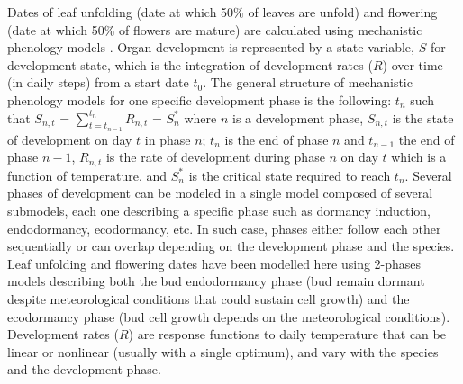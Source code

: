 \documentclass[letterpaper,8pt]{extarticle}  %
\begin{document}
\begin{doublespacing}
\begin{linenumbers}
Dates of leaf unfolding (date at which 50\% of leaves are unfold) and flowering (date at which 50\% of flowers are mature) are calculated using mechanistic phenology models \citep{Chuine2017}. Organ development is represented by a state variable, $S$ for development state, which is the integration of development rates ($R$) over time (in daily steps) from a start date $t_0$. The general structure of mechanistic phenology models for one specific development phase is the following:
$t_n$ such that $S_{n,t}$ = $\sum_{t=t_{n-1}}^{t_n} R_{n,t}$ = $S_n^*$ 
where $n$ is a development phase, $S_{n,t}$ is the state of development on day $t$ in phase $n$; $t_n$ is the end of phase $n$ and  $t_{n-1}$ the end of phase ${n-1}$, $R_{n,t}$ is the rate of development during phase $n$ on day $t$ which is a function of  temperature, and $S_n^*$ is the critical state required to reach $t_n$.  Several phases of development can be modeled in a single model composed of several submodels, each one describing a specific phase such as dormancy induction, endodormancy, ecodormancy, etc. In such case, phases either follow each other sequentially or can overlap depending on the development phase and the species. Leaf unfolding and flowering dates have been modelled here using 2-phases models describing both the bud endodormancy phase (bud remain dormant despite meteorological conditions that could sustain cell growth) and the ecodormancy phase (bud cell growth depends on the meteorological conditions).  Development rates ($R$) are response functions to daily temperature that can be linear or nonlinear (usually with a single optimum), and vary with the species and the development phase. 



\end{linenumbers}
\end{doublespacing}
\end{document}
